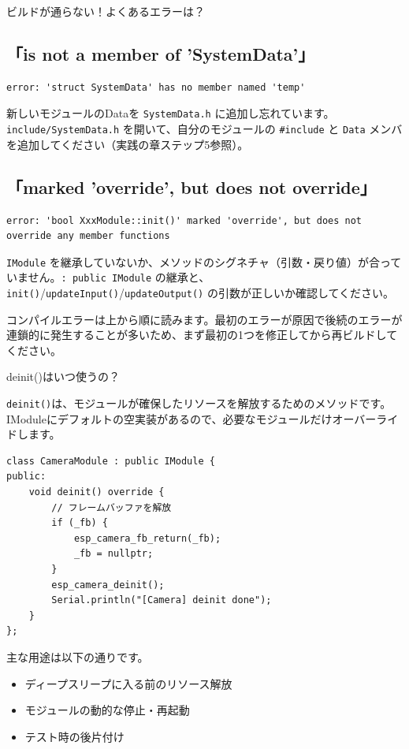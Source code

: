 \begin{qabox}{ビルドが通らない！よくあるエラーは？}
\subsection{「is not a member of 'SystemData'」}

\begin{lstlisting}[language={},numbers=none,backgroundcolor=\color{warnred!5}]
error: 'struct SystemData' has no member named 'temp'
\end{lstlisting}

新しいモジュールのDataを \texttt{SystemData.h} に追加し忘れています。\texttt{include/SystemData.h} を開いて、自分のモジュールの \texttt{\#include} と \texttt{Data} メンバを追加してください（実践の章ステップ5参照）。

\subsection{「marked 'override', but does not override」}

\begin{lstlisting}[language={},numbers=none,backgroundcolor=\color{warnred!5}]
error: 'bool XxxModule::init()' marked 'override', but does not
override any member functions
\end{lstlisting}

\texttt{IModule} を継承していないか、メソッドのシグネチャ（引数・戻り値）が合っていません。\texttt{: public IModule} の継承と、\texttt{init()}/\texttt{updateInput()}/\texttt{updateOutput()} の引数が正しいか確認してください。

\begin{notebox}[エラーメッセージの読み方]
コンパイルエラーは上から順に読みます。最初のエラーが原因で後続のエラーが連鎖的に発生することが多いため、まず最初の1つを修正してから再ビルドしてください。
\end{notebox}

\end{qabox}

\begin{qabox}{deinit()はいつ使うの？}

\texttt{deinit()}は、モジュールが確保したリソースを解放するためのメソッドです。IModuleにデフォルトの空実装があるので、必要なモジュールだけオーバーライドします。

\begin{lstlisting}
class CameraModule : public IModule {
public:
    void deinit() override {
        // フレームバッファを解放
        if (_fb) {
            esp_camera_fb_return(_fb);
            _fb = nullptr;
        }
        esp_camera_deinit();
        Serial.println("[Camera] deinit done");
    }
};
\end{lstlisting}

主な用途は以下の通りです。

\begin{itemize}
  \item ディープスリープに入る前のリソース解放
  \item モジュールの動的な停止・再起動
  \item テスト時の後片付け
\end{itemize}

\end{qabox}
